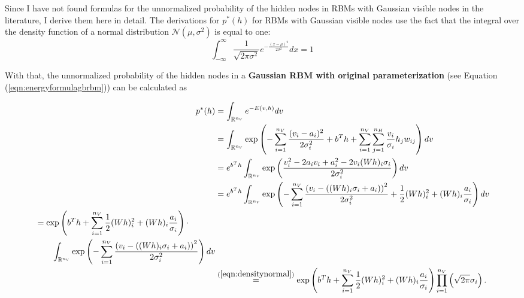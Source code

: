 \documentclass[12pt]{article}
\newcommand{\intrnv}{\int_{\mathbb{R}^{n_{\scaleto{V}{2.5pt}}}}}
\begin{document}
Since I have not found formulas for the unnormalized probability of the hidden nodes in RBMs with Gaussian visible nodes in the literature, I derive them here in detail.
The derivations for $p^*(h)$ for RBMs with Gaussian visible nodes use the fact that the integral over the density function of a normal distribution $\mathcal{N}(\mu, \sigma^2)$ is equal to one:
\begin{equation} \int_{-\infty}^\infty \frac{1}{\sqrt{2 \pi \sigma^2}} e^{ -\frac{(x - \mu)^2}{2 \sigma^2}} dx = 1
\label{eqn:densitynormal}
\end{equation}
 
With that, the unnormalized probability of the hidden nodes in a {\bf Gaussian RBM with original parameterization} (see Equation (\ref{eqn:energyformulagbrbm})) can be calculated as

\begingroup
\allowdisplaybreaks
\begin{align*}
   p^*(h) &= \intrnv e^{-E \left(v,h \right)} dv \\
   &= \intrnv \exp \left( -\sum_{i=1}^{n_V}\frac{(v_i - a_i)^2}{2\sigma_i^2} + b^T h + \sum_{i=1}^{n_V} \sum_{j=1}^{n_H} \frac{v_i}{\sigma_i}h_j w_{ij} \right) dv\\
   &= e^{b^T h} \intrnv \exp \left( \frac{v_i^2 -2 a_i v_i + a_i^2 - 2 v_i (Wh)_i \sigma_i}{2 \sigma_i^2} \right) dv \\
   &= e^{b^T h} \intrnv \exp \left(
      - \sum_{i=1}^{n_V} \frac{{\left( v_i - \left( (Wh)_i \sigma_i + a_i \right) \right)}^2}{2\sigma_i^2} + \frac{1}{2}(Wh)_i^2 + (Wh)_i \frac{a_i}{\sigma_i} \right ) dv \\
   \begin{split}
      &= \exp \left(b^T h + \sum_{i=1}^{n_V} \frac{1}{2}(Wh)_i^2 + (Wh)_i \frac{a_i}{\sigma_i} \right ) \cdot \\
      & \quad \quad \intrnv \exp \left ( - \sum_{i=1}^{n_V} \frac{{\left( v_i - ((Wh)_i \sigma_i + a_i) \right)}^2}{2\sigma_i^2} \right) dv
   \end{split} \\
   & \stackrel{(\ref{eqn:densitynormal})}{=} \exp \left( b^T h + \sum_{i=1}^{n_V} \frac{1}{2}(Wh)_i^2 + (Wh)_i \frac{a_i}{\sigma_i} \right ) \prod_{i=1}^{n_V}\left(\sqrt{2\pi} \sigma_i\right). \\
\end{align*}
\endgroup
\end{document}
